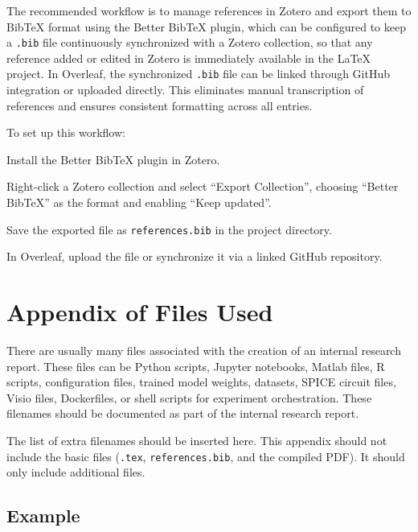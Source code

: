\documentclass{iteso-irr}
\begin{document}
The recommended workflow is to manage references in Zotero and export
them to BibTeX format using the Better BibTeX plugin, which can
be configured to keep a \texttt{.bib} file continuously synchronized
with a Zotero collection, so that any reference added or edited in
Zotero is immediately available in the \LaTeX{} project. In Overleaf,
the synchronized \texttt{.bib} file can be linked through GitHub
integration or uploaded directly. This eliminates manual transcription
of references and ensures consistent formatting across all entries.

To set up this workflow:
%
\begin{letterlist}
  \item Install the Better BibTeX plugin in Zotero.
  \item Right-click a Zotero collection and select
        ``Export Collection'', choosing ``Better BibTeX'' as the format
        and enabling ``Keep updated''.
  \item Save the exported file as \texttt{references.bib} in the
        project directory.
  \item In Overleaf, upload the file or synchronize it via a linked
        GitHub repository.
\end{letterlist}


\section{Appendix of Files Used}
\label{sec:appendix}

There are usually many files associated with the creation of an internal
research report. These files can be Python scripts, Jupyter notebooks,
Matlab files, R scripts, configuration files, trained model weights,
datasets, SPICE circuit files, Visio files, Dockerfiles, or shell scripts
for experiment orchestration. These filenames should be documented as
part of the internal research report.

The list of extra filenames should be inserted here. This appendix should
not include the basic files (\texttt{\theReportFileName.tex},
\texttt{references.bib}, and the compiled PDF). It should only include
additional files.

\subsection{Example}
\end{document}
